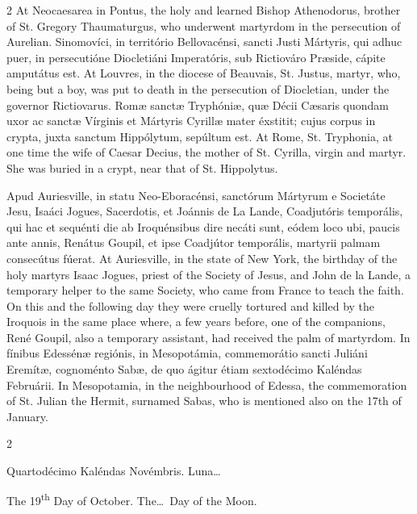 \begin{paracol}{2}
At Neocaesarea in Pontus, the holy 
 and learned Bishop Athenodorus, brother of St. Gregory Thaumaturgus, who 
 underwent martyrdom in the persecution of Aurelian.
\switchcolumn*
{}
Sinomovíci, in 
 território Bellovacénsi, sancti Justi Mártyris, qui adhuc puer, in 
 persecutióne Diocletiáni Imperatóris, sub Rictiováro Præside, cápite 
 amputátus est.
\switchcolumn
{}
At Louvres, in the diocese of 
 Beauvais, St. Justus, martyr, who, being but a boy, was put to death in the 
 persecution of Diocletian, under the governor Rictiovarus.
\switchcolumn*
{}
Romæ sanctæ Tryphóniæ, 
 quæ Décii Cæsaris quondam uxor ac sanctæ Vírginis et Mártyris Cyrillæ mater 
 éxstitit; cujus corpus in crypta, juxta sanctum Hippólytum, sepúltum est.
\switchcolumn
{}
At Rome, St. Tryphonia, at one time 
 the wife of Caesar Decius, the mother of St. Cyrilla, virgin and martyr. 
 She was buried in a crypt, near that of St. Hippolytus.
\switchcolumn*

Apud Auriesville, in 
 statu Neo-Eboracénsi, sanctórum Mártyrum e Societáte Jesu, Isaáci Jogues, 
 Sacerdotis, et Joánnis de La Lande, Coadjutóris temporális, qui hac et 
 sequénti die ab Iroquénsibus dire necáti sunt, eódem loco ubi, paucis ante 
 annis, Renátus Goupil, et ipse Coadjútor temporális, martyrii palmam 
 consecútus fúerat.
\switchcolumn
{}
At Auriesville, in the state of New 
 York, the birthday of the holy martyrs Isaac Jogues, priest of the Society 
 of Jesus, and John de la Lande, a temporary helper to the same Society, who 
 came from France to teach the faith. On this and the following day 
 they were cruelly tortured and killed by the Iroquois in the same place 
 where, a few years before, one of the companions, René Goupil, also a 
 temporary assistant, had received the palm of martyrdom.
\switchcolumn*
{}
In fínibus Edessénæ 
 regiónis, in Mesopotámia, commemorátio sancti Juliáni Eremítæ, cognoménto Sabæ, de quo 
 ágitur étiam sextodécimo Kaléndas Februárii.
\switchcolumn
{}
In Mesopotamia, in the neighbourhood 
 of Edessa, the commemoration of St. Julian the Hermit, surnamed Sabas, who 
 is mentioned also on the 17th of January.
\switchcolumn*
{}
\end{paracol}


\begin{paracol}{2}
\begin{center}{\color{gregoriocolor} Quartodécimo Kaléndas Novémbris. 
 Luna\dots\ }\end{center}
\switchcolumn
{}
\begin{center}{\color{gregoriocolor} The   19\textsuperscript{th} Day of 
 October. The\dots\ Day of the Moon.}\end{center}
\end{paracol}

